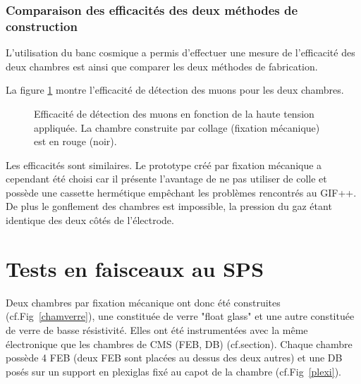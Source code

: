  \subsubsection{Comparaison des efficacités des deux méthodes de construction}
L'utilisation du banc cosmique a permis d'effectuer une mesure de l'efficacité des deux chambres est ainsi que comparer les deux méthodes de fabrication.

La figure \ref{comparaison2} montre l'efficacité de détection des muons pour les deux chambres.

\begin{figure}[!ht]
	\centering
	\caption{Efficacité de détection des muons en fonction de la haute tension appliquée. La chambre construite par collage (fixation mécanique) est en rouge (noir).}
	\label{comparaison2}
\end{figure}

Les efficacités sont similaires. Le prototype créé par fixation mécanique a cependant été choisi car il présente l'avantage de ne pas utiliser de colle et possède une cassette hermétique empêchant les problèmes rencontrés au GIF++. De plus le gonflement des chambres est impossible, la pression du gaz étant identique des deux côtés de l'électrode.

\section{Tests en faisceaux au SPS}
Deux chambres par fixation mécanique ont donc été construites (cf.Fig~\ref{chamverre}), une constituée de verre "float glass" et une autre constituée de verre de basse résistivité. Elles ont été instrumentées avec la même électronique que les chambres de CMS (FEB, DB) (cf.section\label{cmselec}). Chaque chambre possède \num{4} FEB (deux FEB sont placées au dessus des deux autres) et une DB posés sur un support en plexiglas fixé au capot de la chambre (cf.Fig~\ref{plexi}).

